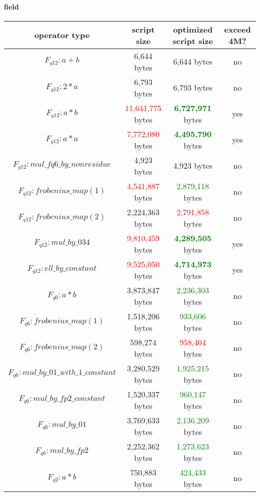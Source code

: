 \paragraph*{field}

\begin{center}
\begin{tabular}{|c|c|c|c|} \hline
operator type & script size & optimized script size & exceed 4M? \\ \hline
$F_{q12}: a + b$ & 6,644 bytes & 6,644 bytes & no  \\ \hline
$F_{q12}: 2 * a$ & 6,793 bytes & 6,793 bytes & no \\ \hline
$F_{q12}: a * b$ & \textcolor{red}{11,641,775} bytes & \textcolor{green}{\textbf{6,727,971}} bytes & yes \\ \hline
$F_{q12}: a * a$ & \textcolor{red}{7,772,080} bytes & \textcolor{green}{\textbf{4,495,790}} bytes & yes \\ \hline
$F_{q12}: mul\_fq6\_by\_nonresidue$ & 4,923 bytes & 4,923 bytes & no \\ \hline
$F_{q12}: frobenius\_map(1)$ & \textcolor{red}{4,541,887} bytes & \textcolor{green}{2,879,118} bytes & no \\ \hline
$F_{q12}: frobenius\_map(2)$ & 2,224,363 bytes & \textcolor{red}{2,791,858} bytes  & no \\ \hline
$F_{q12}: mul\_by\_034$ & \textcolor{red}{9,810,459} bytes & \textcolor{green}{\textbf{4,289,505}} bytes & yes \\ \hline
$F_{q12}: ell\_by\_constant$ & \textcolor{red}{9,525,050} bytes & \textcolor{green}{\textbf{4,714,973}} bytes  & yes \\ \hline
$F_{q6}: a * b$ & 3,873,847 bytes & \textcolor{green}{2,236,303} bytes & no \\ \hline
$F_{q6}: frobenius\_map(1)$ & 1,518,206 bytes & \textcolor{green}{933,606} bytes & no \\ \hline
$F_{q6}: frobenius\_map(2)$ & 598,274 bytes & \textcolor{red}{958,404} bytes & no \\ \hline
$F_{q6}: mul\_by\_01\_with\_1\_constant$ & 3,280,529 bytes & \textcolor{green}{1,925,215} bytes & no \\ \hline
$F_{q6}: mul\_by\_fp2\_constant$ &  1,520,337 bytes & \textcolor{green}{960,147} bytes & no \\ \hline
$F_{q6}: mul\_by\_01$ & 3,769,633 bytes & \textcolor{green}{2,136,209} bytes & no \\ \hline
$F_{q6}: mul\_by\_fp2$ & 2,252,362 bytes & \textcolor{green}{1,273,623} bytes & no \\ \hline
$F_{q2}: a * b$ & 750,883 bytes & \textcolor{green}{424,433} bytes & no \\ \hline

\end{tabular}
\end{center}
